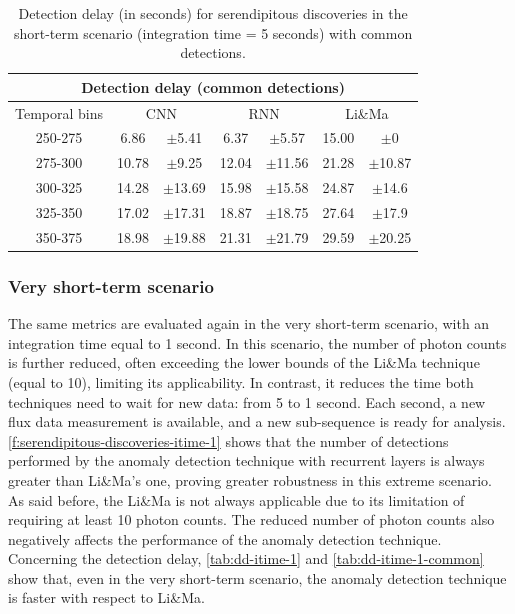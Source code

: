  
\begin{table}[!ht]
\centering
\begin{tabular}{|c|cc|cc|cc|} 
\hline
\multicolumn{7}{|c|}{\textbf{Detection delay} (common detections)} \\ 
\hline
\multicolumn{1}{|c|}{Temporal bins} & \multicolumn{2}{c|}{CNN} & \multicolumn{2}{c|}{RNN} & \multicolumn{2}{c|}{Li\&Ma} \\ 
\hline
250-275 &  6.86 &  $\pm$5.41 &  6.37 &  $\pm$5.57 & 15.00 &  $\pm$0 \\
275-300 & 10.78 &  $\pm$9.25 & 12.04 & $\pm$11.56 & 21.28 & $\pm$10.87 \\
300-325 & 14.28 & $\pm$13.69 & 15.98 & $\pm$15.58 & 24.87 & $\pm$14.6 \\
325-350 & 17.02 & $\pm$17.31 & 18.87 & $\pm$18.75 & 27.64 & $\pm$17.9 \\
350-375 & 18.98 & $\pm$19.88 & 21.31 & $\pm$21.79 & 29.59 & $\pm$20.25 \\
\hline
\end{tabular}
\caption{Detection delay (in seconds) for serendipitous discoveries in the short-term scenario (integration time = 5 seconds) with common detections.}
\label{tab:dd-itime-5-common}
\end{table}






\FloatBarrier
\subsubsection{Very short-term scenario}
\label{s:Serendipitous-Discoveries-Results-Very-Short-Term}
The same metrics are evaluated again in the very short-term scenario, with an integration time equal to 1 second. In this scenario, the number of photon counts is further reduced, often exceeding the lower bounds of the Li\&Ma technique (equal to 10), limiting its applicability. In contrast, it reduces the time both techniques need to wait for new data: from 5 to 1 second. Each second, a new flux data measurement is available, and a new sub-sequence is ready for analysis. 
\autoref{f:serendipitous-discoveries-itime-1} shows that the number of detections performed by the anomaly detection technique with recurrent layers is always greater than Li\&Ma's one, proving greater robustness in this extreme scenario. As said before, the Li\&Ma is not always applicable due to its limitation of requiring at least 10 photon counts. The reduced number of photon counts also negatively affects the performance of the anomaly detection technique. Concerning the detection delay, \autoref{tab:dd-itime-1} and \autoref{tab:dd-itime-1-common} show that, even in the very short-term scenario, the anomaly detection technique is faster with respect to Li\&Ma.

